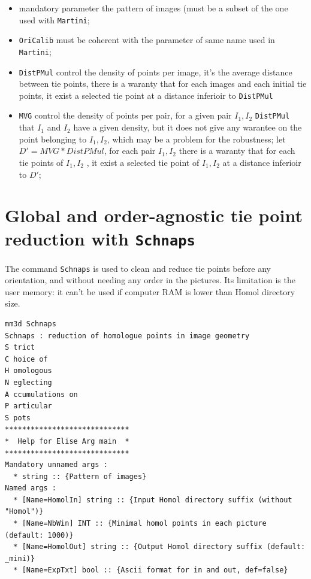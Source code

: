 \begin{itemize}
   \item mandatory parameter the pattern of images (must be a subset of the one used with {\tt Martini};
   \item  {\tt OriCalib} must be coherent with the parameter of same name used in {\tt Martini};
   \item  {\tt DistPMul} control the density of points per image, it's the average distance between 
          tie points, there is a waranty that for each images and each initial tie points, it exist
          a selected tie point at a distance inferioir to  {\tt DistPMul}
   \item  {\tt MVG} control the density of points per pair, for a given pair $I_1,I_2$
          {\tt DistPMul} that $I_1$ and $I_2$ have a given density, but it does not give any warantee
          on the point belonging to $I_1,I_2$, which may be a problem for the robustness;
          let $D'=MVG*DistPMul$, for each pair $I_1,I_2$   there is a waranty 
          that for each tie points of $I_1,I_2$ , it exist
          a selected tie point of $I_1,I_2$ at a distance inferioir to  $D'$;
\end{itemize}



\section{Global and order-agnostic tie point reduction with {\tt Schnaps}}
The command {\tt Schnaps} is used to clean and reduce tie points before any orientation, and without needing any order in the pictures.
Its limitation is the user memory: it can't be used if computer RAM is lower than Homol directory size.

\begin{verbatim}
mm3d Schnaps
Schnaps : reduction of homologue points in image geometry
S trict           
C hoice of        
H omologous       
N eglecting       
A ccumulations on 
P articular       
S pots
*****************************
*  Help for Elise Arg main  *
*****************************
Mandatory unnamed args : 
  * string :: {Pattern of images}
Named args : 
  * [Name=HomolIn] string :: {Input Homol directory suffix (without "Homol")}
  * [Name=NbWin] INT :: {Minimal homol points in each picture (default: 1000)}
  * [Name=HomolOut] string :: {Output Homol directory suffix (default: _mini)}
  * [Name=ExpTxt] bool :: {Ascii format for in and out, def=false}
\end{verbatim}

